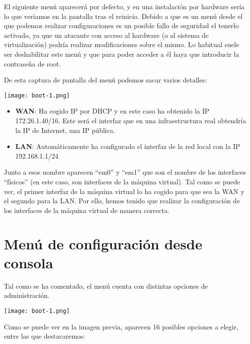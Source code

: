 El siguiente menú aparecerá por defecto, y en una instalación por hardware sería lo que veríamos en la pantalla tras el reinicio. Debido a que es un menú desde el que podemos realizar configuraciones es un posible fallo de seguridad el tenerlo activado, ya que un atacante con acceso al hardware (o al sistema de virtualización) podría realizar modificaciones sobre el mismo. Lo habitual suele ser deshabilitar este menú y que para poder acceder a él haya que introducir la contraseña de root.

De esta captura de pantalla del menú podemos sacar varios detalles:

\begin{center}
    \texttt{[image: boot-1.png]}
\end{center}

\begin{itemize}
    \item \textbf{WAN}: Ha cogido IP por DHCP y en este caso ha obtenido la IP 172.26.1.40/16. Este será el interfaz que en una infraestructura real obtendría la IP de Internet, una IP pública.
    \item \textbf{LAN}: Automáticamente ha configurado el interfaz de la red local con la IP 192.168.1.1/24
\end{itemize}


Junto a esos nombre aparecen “em0” y “em1” que son el nombre de los interfaces “físicos” (en este caso, son interfaces de la máquina virtual). Tal como se puede ver, el primer interfaz de la máquina virtual lo ha cogido para que sea la WAN y el segundo para la LAN. Por ello, hemos tenido que realizar la configuración de los interfaces de la máquina virtual de manera correcta.


\section{Menú de configuración desde consola}
Tal como se ha comentado, el menú cuenta con distintas opciones de administración.

\begin{center}
    \texttt{[image: boot-1.png]}
\end{center}

Como se puede ver en la imagen previa, aparecen 16 posibles opciones a elegir, entre las que destacaremos:

